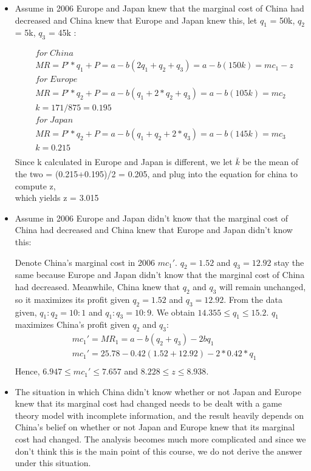 \documentclass[a4paper]{article}
\begin{document}
    \begin{answer}[Shipbuilding (2)]
    \begin{itemize}
        \item Assume in 2006 Europe and Japan knew that the marginal cost of China had decreased and China knew that Europe and Japan knew this, let $q_1$ = 50k, $q_2$ = 5k, $q_3$ = 45k :
        
        \begin{align*}
        & for \; China \\ 
        & MR = P’*q_1+P = a-b(2q_1+q_2+q_3) = a-b(150k) = mc_1-z \\  
        & for \; Europe \\ 
        & MR = P’*q_2+P = a-b(q_1+2*q_2+q_3) = a-b(105k) = mc_2 \\  
        & k = 171/875 = 0.195  \\
        & for \; Japan \\
        & MR = P’*q_2+P = a-b(q_1+q_2+2*q_3) = a-b(145k) = mc_3 \\   
        & k = 0.215 \\
        \end{align*}
        Since k calculated in Europe and Japan is different, we let $\bar{k}$ be the mean of the two  = (0.215+0.195)/2 = 0.205, and plug into the equation for china to compute z,\\ which yields z = 3.015 

        
        \item Assume in 2006 Europe and Japan didn't know that the marginal cost of China had decreased and China knew that Europe and Japan didn't know this: 


        Denote China's marginal cost in 2006 $mc_1'$. $q_2=1.52$ and $q_3=12.92$ stay the same because Europe and Japan didn't know that the marginal cost of China had decreased. Meanwhile, China knew that $q_2$ and $q_3$ will remain unchanged, so it maximizes its profit given $q_2=1.52$ and $q_3=12.92$. From the data given, $q_1 : q_2 = 10: 1$ and $q_1 : q_3 = 10 : 9$. We obtain $14.355 \leq q_1 \leq 15.2$. $q_1$ maximizes China's profit given $q_2$ and $q_3$:
        \begin{align*}
            &mc_1' = MR_1 = a- b(q_2+q_3) - 2bq_1 \\
            &mc_1' = 25.78 - 0.42(1.52+12.92) - 2*0.42*q_1 \\
        \end{align*}
        Hence, $6.947 \leq mc_1' \leq 7.657$ and $8.228 \leq z \leq 8.938$.
        
        \item The situation in which China didn't know whether or not Japan and Europe knew that its marginal cost had changed needs to be dealt with a game theory model with incomplete information, and the result heavily depends on China's belief on whether or not Japan and Europe knew that its marginal cost had changed. The analysis becomes much more complicated and since we don't think this is the main point of this course, we do not derive the answer under this situation.
    \end{itemize}
    \end{answer}
    
\end{document}
